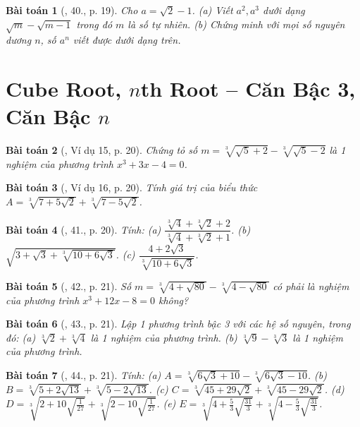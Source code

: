 \documentclass{article}
\newtheorem{baitoan}{Bài toán}
\begin{document}
\begin{baitoan}[\cite{Binh_Toan_9_tap_1}, 40., p. 19]
	Cho $a = \sqrt{2} - 1$. (a) Viết $a^2,a^3$ dưới dạng $\sqrt{m} - \sqrt{m - 1}$ trong đó $m$ là số tự nhiên. (b) Chứng minh với mọi số nguyên dương $n$, số $a^n$ viết được dưới dạng trên.
\end{baitoan}


\section{Cube Root, $n$th Root -- Căn Bậc 3, Căn Bậc $n$}

\begin{baitoan}[\cite{Binh_Toan_9_tap_1}, Ví dụ 15, p. 20]
	Chứng tỏ số $m = \sqrt[3]{\sqrt{5} + 2} - \sqrt[3]{\sqrt{5} - 2}$ là 1 nghiệm của phương trình $x^3 + 3x - 4 = 0$.
\end{baitoan}

\begin{baitoan}[\cite{Binh_Toan_9_tap_1}, Ví dụ 16, p. 20]
	Tính giá trị của biểu thức $A = \sqrt[3]{7 + 5\sqrt{2}} + \sqrt[3]{7 - 5\sqrt{2}}$.
\end{baitoan}

\begin{baitoan}[\cite{Binh_Toan_9_tap_1}, 41., p. 20]
	Tính: (a) $\dfrac{\sqrt[3]{4} + \sqrt[3]{2} + 2}{\sqrt[3]{4} + \sqrt[3]{2} + 1}$. (b) $\sqrt{3 + \sqrt{3} + \sqrt[3]{10 + 6\sqrt{3}}}$. (c) $\dfrac{4 + 2\sqrt{3}}{\sqrt[3]{10 + 6\sqrt{3}}}$.
\end{baitoan}

\begin{baitoan}[\cite{Binh_Toan_9_tap_1}, 42., p. 21]
	Số $m = \sqrt[3]{4 + \sqrt{80}} - \sqrt[3]{4 - \sqrt{80}}$ có phải là nghiệm của phương trình $x^3 + 12x - 8 = 0$ không?
\end{baitoan}

\begin{baitoan}[\cite{Binh_Toan_9_tap_1}, 43., p. 21]
	Lập 1 phương trình bậc 3 với các hệ số nguyên, trong đó: (a) $\sqrt[3]{2} + \sqrt[3]{4}$ là 1 nghiệm của phương trình. (b) $\sqrt[3]{9} - \sqrt[3]{3}$ là 1 nghiệm của phương trình.
\end{baitoan}

\begin{baitoan}[\cite{Binh_Toan_9_tap_1}, 44., p. 21]
	Tính: (a) $A = \sqrt[3]{6\sqrt{3} + 10} - \sqrt[3]{6\sqrt{3} - 10}$. (b) $B = \sqrt[3]{5 + 2\sqrt{13}} + \sqrt[3]{5 - 2\sqrt{13}}$. (c) $C = \sqrt[3]{45 + 29\sqrt{2}} + \sqrt[3]{45 - 29\sqrt{2}}$. (d) $D = \sqrt[3]{2 + 10\sqrt{\frac{1}{27}}} + \sqrt[3]{2 - 10\sqrt{\frac{1}{27}}}$. (e) $E = \sqrt[3]{4 + \frac{5}{3}\sqrt{\frac{31}{3}}} + \sqrt[3]{4 - \frac{5}{3}\sqrt{\frac{31}{3}}}$.
\end{baitoan}
\end{document}

